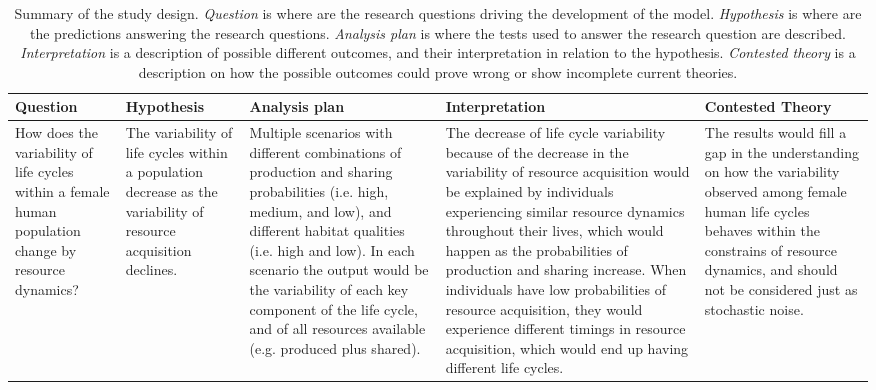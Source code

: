 \documentclass{article}
\begin{document}
\begin{table}[H]
    \centering
    \caption{Summary of the study design. \emph{Question} is where are the research questions driving the development of the model. \emph{Hypothesis} is where are the predictions answering the research questions. \emph{Analysis plan} is where the tests used to answer the research question are described. \emph{Interpretation} is a description of possible different outcomes, and their interpretation in relation to the hypothesis. \emph{Contested theory} is a description on how the possible outcomes could prove wrong or show incomplete current theories.}
    \begin{adjustbox}{width=\textwidth}
    \begin{tabular}{p{4cm}p{4cm}p{4cm}p{4cm}p{4cm} }
    \hline
    Question & Hypothesis & Analysis plan & Interpretation & Contested Theory \\ 
    \hline
    How does the variability of life cycles within a female human population change by resource dynamics? & The variability of life cycles within a population decrease as the variability of resource acquisition declines.  & Multiple scenarios with different combinations of production and sharing probabilities (i.e. high, medium, and low), and different habitat qualities (i.e. high and low). In each scenario the output would be the variability of each key component of the life cycle, and of all resources available (e.g. produced plus shared). & The decrease of life cycle variability because of the decrease in the variability of resource acquisition would be explained by individuals experiencing similar resource dynamics throughout their lives, which would happen as the probabilities of production and sharing increase. When individuals have low probabilities of resource acquisition, they would experience different timings in resource acquisition, which would end up having different life cycles. & The results would fill a gap in the understanding on how the variability observed among female human life cycles behaves within the constrains of resource dynamics, and should not be considered just as stochastic noise.\\  

\end{tabular}
\end{adjustbox}
\end{table}
\end{document}
